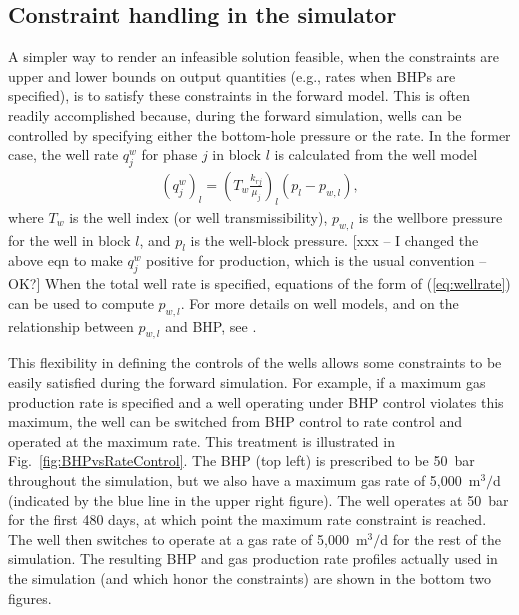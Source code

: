 \documentclass[twocolumn,numbook]{svjour3}          %
\begin{document}
\subsection{Constraint handling in the simulator}  \label{sec:constr-sim}

A simpler way to render an infeasible solution feasible, when the
constraints are upper and lower bounds on output quantities 
(e.g., rates when BHPs are specified), is to satisfy these constraints 
in the forward model. This is often readily accomplished because, during the forward
simulation, wells can be controlled by specifying either the bottom-hole 
pressure or the rate. In the former case,
the well rate $q_j^w$ for phase $j$ in block $l$ is calculated from the well model
%
\begin{align}
\label{eq:wellrate}
  \left( q_j^w \right)_l = \left( T_w\frac{k_{rj}}{\mu_j} \right)_l (p_l - p_{w,l}),
\end{align}
%
where $T_w$ is the well index (or well transmissibility), $p_{w,l}$ is the wellbore pressure for the well in block $l$, and $p_l$ is the well-block pressure. [xxx -- I changed the above eqn to make $q_j^w$ positive for production, which is the usual convention -- OK?]
When the total well rate is specified, equations of the form of (\ref{eq:wellrate}) can be used to compute $p_{w,l}$. For more details on well models, and on the relationship between $p_{w,l}$ and BHP, see \cite{Cao:Thesis}.
%

This flexibility in defining the controls of the wells allows some constraints
to be easily satisfied during the forward simulation. For example, if a maximum
gas production rate is specified and a well operating under BHP control violates
this maximum, the well can be switched from BHP control to rate control and
operated at the maximum rate. This treatment is illustrated in
Fig.~\ref{fig:BHPvsRateControl}. The BHP (top left) is prescribed to be 50~bar
throughout the simulation, but we also have a maximum gas rate of 5,000~m$^3/$d
(indicated by the blue line in the upper right figure). The well operates at
50~bar for the first 480 days, at which point the maximum rate constraint is
reached. The well then switches to operate at a gas rate of 5,000~m$^3/$d for the
rest of the simulation. The resulting BHP and gas production rate profiles
actually used in the simulation (and which honor the constraints) are shown in
the bottom two figures.
\end{document}
